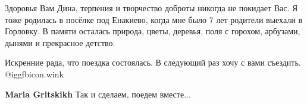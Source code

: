 \begin{itemize}

Здоровья Вам Дина, терпения и творчество доброты никогда не покидает Вас. Я
тоже родилась в посёлке под Енакиево, когда мне было 7 лет родители выехали в
Горловку. В памяти осталась природа, цветы, деревья, поля с горохом, арбузами,
дынями и прекрасное детство.


Искренние рада, что поездка состоялась. В следующий раз хочу с вами съездить.
@igg{fbicon.wink} 

\textbf{Maria Gritskikh} Так и сделаем, поедем вместе...

\end{itemize} %
